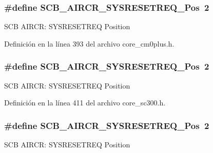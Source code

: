 \subsubsection[{\texorpdfstring{S\+C\+B\+\_\+\+A\+I\+R\+C\+R\+\_\+\+S\+Y\+S\+R\+E\+S\+E\+T\+R\+E\+Q\+\_\+\+Pos}{SCB_AIRCR_SYSRESETREQ_Pos}}]{\setlength{\rightskip}{0pt plus 5cm}\#define S\+C\+B\+\_\+\+A\+I\+R\+C\+R\+\_\+\+S\+Y\+S\+R\+E\+S\+E\+T\+R\+E\+Q\+\_\+\+Pos~2}\hypertarget{group___c_m_s_i_s___s_c_b_gaffb2737eca1eac0fc1c282a76a40953c}{}\label{group___c_m_s_i_s___s_c_b_gaffb2737eca1eac0fc1c282a76a40953c}
S\+CB A\+I\+R\+CR\+: S\+Y\+S\+R\+E\+S\+E\+T\+R\+EQ Position 

Definición en la línea 393 del archivo core\+\_\+cm0plus.\+h.

\subsubsection[{\texorpdfstring{S\+C\+B\+\_\+\+A\+I\+R\+C\+R\+\_\+\+S\+Y\+S\+R\+E\+S\+E\+T\+R\+E\+Q\+\_\+\+Pos}{SCB_AIRCR_SYSRESETREQ_Pos}}]{\setlength{\rightskip}{0pt plus 5cm}\#define S\+C\+B\+\_\+\+A\+I\+R\+C\+R\+\_\+\+S\+Y\+S\+R\+E\+S\+E\+T\+R\+E\+Q\+\_\+\+Pos~2}\hypertarget{group___c_m_s_i_s___s_c_b_gaffb2737eca1eac0fc1c282a76a40953c}{}\label{group___c_m_s_i_s___s_c_b_gaffb2737eca1eac0fc1c282a76a40953c}
S\+CB A\+I\+R\+CR\+: S\+Y\+S\+R\+E\+S\+E\+T\+R\+EQ Position 

Definición en la línea 411 del archivo core\+\_\+sc300.\+h.

\subsubsection[{\texorpdfstring{S\+C\+B\+\_\+\+A\+I\+R\+C\+R\+\_\+\+S\+Y\+S\+R\+E\+S\+E\+T\+R\+E\+Q\+\_\+\+Pos}{SCB_AIRCR_SYSRESETREQ_Pos}}]{\setlength{\rightskip}{0pt plus 5cm}\#define S\+C\+B\+\_\+\+A\+I\+R\+C\+R\+\_\+\+S\+Y\+S\+R\+E\+S\+E\+T\+R\+E\+Q\+\_\+\+Pos~2}\hypertarget{group___c_m_s_i_s___s_c_b_gaffb2737eca1eac0fc1c282a76a40953c}{}\label{group___c_m_s_i_s___s_c_b_gaffb2737eca1eac0fc1c282a76a40953c}
S\+CB A\+I\+R\+CR\+: S\+Y\+S\+R\+E\+S\+E\+T\+R\+EQ Position 

